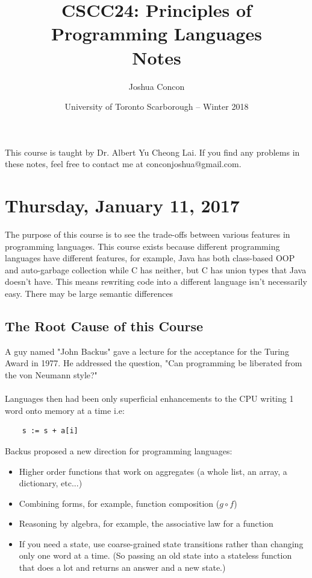 \documentclass[12pt]{article}
\begin{document}
\title{CSCC24: Principles of Programming Languages\\ Notes}
\date{University of Toronto Scarborough -- Winter 2018}
\author{Joshua Concon}
\maketitle
This course is taught by Dr. Albert Yu Cheong Lai. If you find any problems in these notes, feel free to contact me at conconjoshua@gmail.com.

\tableofcontents

\pagebreak

\section{Thursday, January 11, 2017}

The purpose of this course is to see the trade-offs between various features in programming languages. This course exists because different programming languages have different features, for example, Java has both class-based OOP and auto-garbage collection while C has neither, but C has union types that Java doesn't have. This means rewriting code into a different language isn't necessarily easy. There may be large semantic differences

\subsection{The Root Cause of this Course}

A guy named "John Backus" gave a lecture for the acceptance for the Turing Award in 1977. He addressed the question, "Can programming be liberated from the von Neumann style?"\\
\\
Languages then had been only superficial enhancements to the CPU writing 1 word onto memory at a time i.e:

\begin{lstlisting}
	s := s + a[i]
\end{lstlisting}

Backus proposed a new direction for programming languages:
\begin{itemize}
    \item Higher order functions that work on aggregates (a whole list, an array, a dictionary, etc...)
    \item Combining forms, for example, function composition ($g \circ f$)
    \item Reasoning by algebra, for example, the associative law for a function
    \item If you need a state, use coarse-grained state transitions rather than changing only one word at a time. (So passing an old state into a stateless function that does a lot and returns an answer and a new state.)
\end{itemize}
\end{document}
